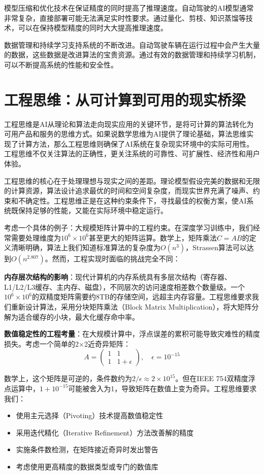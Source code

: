 模型压缩和优化技术在保证精度的同时提高了推理速度。自动驾驶的AI模型通常非常复杂，直接部署可能无法满足实时性要求。通过量化、剪枝、知识蒸馏等技术，可以在保持模型精度的同时大大提高推理速度。

数据管理和持续学习支持系统的不断改进。自动驾驶车辆在运行过程中会产生大量的数据，这些数据是改进算法的宝贵资源。通过有效的数据管理和持续学习机制，可以不断提高系统的性能和安全性。

\section{工程思维：从可计算到可用的现实桥梁}

工程思维是AI从理论和算法走向现实应用的关键环节，是将可计算的算法转化为可用产品和服务的思维方式。如果说数学思维为AI提供了理论基础，算法思维实现了计算方法，那么工程思维则确保了AI系统在复杂现实环境中的实际可用性。工程思维不仅关注算法的正确性，更关注系统的可靠性、可扩展性、经济性和用户体验。

工程思维的核心在于处理理想与现实之间的差距。理论模型假设完美的数据和无限的计算资源，算法设计追求最优的时间和空间复杂度，而现实世界充满了噪声、约束和不确定性。工程思维正是在这种约束条件下，寻找最佳的权衡方案，使AI系统既保持足够的性能，又能在实际环境中稳定运行。

考虑一个具体的例子：大规模矩阵计算中的工程约束。在深度学习训练中，我们经常需要处理维度为$10^6 \times 10^6$甚至更大的矩阵运算。数学上，矩阵乘法$C = AB$的定义清晰明确，算法上我们知道标准算法的复杂度为$O(n^3)$，Strassen算法可以达到$O(n^{2.807})$。然而，工程实现时面临的挑战完全不同：

\textbf{内存层次结构的影响}：现代计算机的内存系统具有多层次结构（寄存器、L1/L2/L3缓存、主内存、磁盘），不同层次的访问速度相差数个数量级。一个$10^6 \times 10^6$的双精度矩阵需要约8TB的存储空间，远超主内存容量。工程思维要求我们重新设计算法，采用分块矩阵乘法（Block Matrix Multiplication），将大矩阵分解为适合缓存的小块，最大化缓存命中率。

\textbf{数值稳定性的工程考量}：在大规模计算中，浮点误差的累积可能导致灾难性的精度损失。考虑一个简单的2×2近奇异矩阵：
$$A = \begin{pmatrix} 1 & 1 \\ 1 & 1+\epsilon \end{pmatrix}, \quad \epsilon = 10^{-15}$$

数学上，这个矩阵是可逆的，条件数约为$2/\epsilon \approx 2 \times 10^{15}$。但在IEEE 754双精度浮点运算中，$1 + 10^{-15}$可能被舍入为1，导致矩阵在数值上变为奇异。工程思维要求我们：
\begin{itemize}
\item 使用主元选择（Pivoting）技术提高数值稳定性
\item 采用迭代精化（Iterative Refinement）方法改善解的精度
\item 实施条件数检测，在矩阵接近奇异时发出警告
\item 考虑使用更高精度的数据类型或专门的数值库
\end{itemize}

